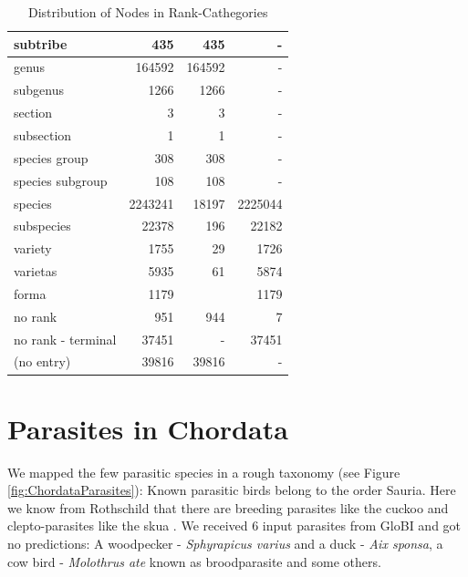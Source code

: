 \begin{table}[h!]
\begin{center}
\begin{tabular}{ |l|r||r|r| }
          subtribe & 435                      & 435 & - \\ \hline
          \setrow{\bfseries}genus & 164592    & 164592 & - \\
          subgenus & 1266                     & 1266 & - \\
          section & 3                         & 3 & - \\
          subsection & 1                      & 1 & - \\
          species group & 308                 & 308 & - \\
          species subgroup & 108              & 108 & - \\ \hline
          \setrow{\bfseries}species & 2243241 & 18197 & 2225044 \\
          subspecies & 22378                  & 196 & 22182 \\
          variety & 1755                      & 29 & 1726 \\
          varietas & 5935                     & 61 & 5874 \\
          forma & 1179                        & & 1179 \\
          \hline \hline
          no rank & 951                       & 944 & 7 \\
          no rank - terminal & 37451          & - & 37451 \\
          (no entry) & 39816                  & 39816 & - \\
          \hline  
        \end{tabular}
        \caption{Distribution of Nodes in Rank-Cathegories}
        \label{table:taxa} 
      \end{center}  
    \end{table}

\newpage

  \section{Parasites in Chordata} \label{sec:parasites in chordata}
    We mapped the few parasitic species in a rough taxonomy (see Figure \ref{fig:ChordataParasites}): 
      Known parasitic birds belong to the order Sauria. Here we know from Rothschild that there are 
      breeding parasites like the cuckoo and clepto-parasites like the skua  \cite{Rothschild1957}. We
      received 6 input parasites from GloBI and got no predictions: A woodpecker - 
      \textit{Sphyrapicus varius} and a duck - \textit{Aix sponsa}, a cow bird - \textit{Molothrus ate} 
      known as broodparasite and some others.
      
